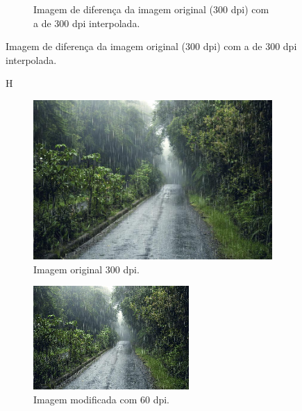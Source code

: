 \documentclass{article}
\begin{document}
\begin{figure}[H]
\begin{subfigure}[b]{0.3\textwidth}
        \caption{Imagem de diferença da imagem original (300 dpi) com a de 300 dpi interpolada.}
    \end{subfigure}%
\end{figure}

\begin{figure}{H}
    \centering
    \caption{Imagens da chuva.}
    \begin{subfigure}[b]{0.3\textwidth}
        \includegraphics[width=\textwidth]{imgs/3.1.png}
        \caption{Imagem original 300 dpi.}
    \end{subfigure}%
    \hfill
    \begin{subfigure}[b]{0.3\textwidth}
        \includegraphics[width=\textwidth]{imgs/3.2.png}
        \caption{Imagem modificada com 60 dpi.}
    \end{subfigure}%
    \hfill
    \begin{subfigure}[b]{0.3\textwidth}

\end{subfigure}
\end{figure}
\end{document}
